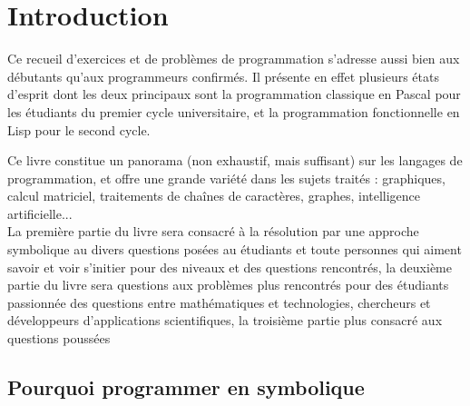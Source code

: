 \section{Introduction}
Ce recueil d'exercices et de problèmes de programmation s'adresse aussi bien aux débutants qu'aux programmeurs confirmés. Il présente en effet plusieurs états d'esprit dont les deux principaux sont la programmation classique en Pascal pour les étudiants du premier cycle universitaire, et la programmation fonctionnelle en Lisp pour le second cycle.

Ce livre constitue un panorama (non exhaustif, mais suffisant) sur les langages de programmation, et offre une grande variété dans les sujets traités : graphiques, calcul matriciel, traitements de chaînes de caractères, graphes, intelligence artificielle...
\\
La première partie du livre sera consacré \`a la résolution par une approche symbolique au divers questions posées au étudiants et toute personnes qui aiment savoir et voir s'initier  pour des niveaux et des questions rencontrés, la deuxième partie du livre sera questions aux problèmes plus rencontrés pour des étudiants passionnée des questions entre mathématiques et technologies, chercheurs et développeurs d'applications scientifiques, la troisième partie plus consacré aux questions poussées

\subsection{Pourquoi programmer en symbolique }